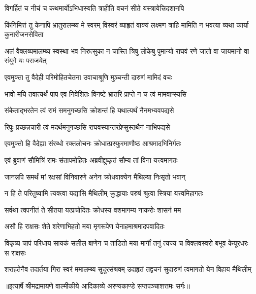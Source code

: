 \twolineshloka
{विगर्हितं च नीचं च कथमार्योऽभिधास्यति}
{त्राहीति वचनं सीते यस्त्रायेत्त्रिदशानपि} %

\threelineshloka
{किंनिमित्तं तु केनापि भ्रातुरालम्ब्य मे स्वरम्}
{विस्वरं व्याहृतं वाक्यं लक्ष्मण त्राहि मामिति}
{न भवत्या व्यथा कार्या कुनारीजनसेविता} %

\threelineshloka
{अलं वैक्लव्यमालम्ब्य स्वस्था भव निरुत्सुका}
{न चास्ति त्रिषु लोकेषु पुमान्यो राघवं रणे}
{जातो वा जायमानो वा संयुगे यः पराजयेत्} %

\twolineshloka
{एवमुक्ता तु वैदेही परिमोहितचेतना}
{उवाचाश्रूणि मुञ्चन्ती दारुणं मामिदं वचः} %

\twolineshloka
{भावो मयि तवात्यर्थं पाप एव निवेशितः}
{विनष्टे भ्रातरि प्राप्ते न च त्वं मामवाप्स्यसि} %

\twolineshloka
{संकेताद्भरतेन त्वं रामं समनुगच्छसि}
{क्रोशन्तं हि यथात्यर्थं नैनमभ्यवपद्यसे} %

\twolineshloka
{रिपुः प्रच्छन्नचारी त्वं मदर्थमनुगच्छसि}
{राघवस्यान्तरप्रेप्सुस्तथैनं नाभिपद्यसे} %

\twolineshloka
{एवमुक्तो हि वैदेह्या संरब्धो रक्तलोचनः}
{क्रोधात्प्रस्फुरमाणौष्ठ आश्रमादभिनिर्गतः} %

\twolineshloka
{एवं ब्रुवाणं सौमित्रिं रामः संतापमोहितः}
{अब्रवीद्दुष्कृतं सौम्य तां विना यत्त्वमागतः} %

\twolineshloka
{जानन्नपि समर्थं मां रक्षसां विनिवारणे}
{अनेन क्रोधवाक्येन मैथिल्या निःसृतो भवान्} %

\twolineshloka
{न हि ते परितुष्यामि त्यक्त्वा यद्यासि मैथिलीम्}
{क्रुद्धायाः परुषं श्रुत्वा स्त्रिया यत्त्वमिहागतः} %

\twolineshloka
{सर्वथा त्वपनीतं ते सीतया यत्प्रचोदितः}
{क्रोधस्य वशमागम्य नाकरोः शासनं मम} %

\twolineshloka
{असौ हि राक्षसः शेते शरेणाभिहतो मया}
{मृगरूपेण येनाहमाश्रमादपवादितः} %

\fourlineindentedshloka
{विकृष्य चापं परिधाय सायकं}
{ सलील बाणेन च ताडितो मया}
{मार्गीं तनुं त्यज्य च विक्लवस्वरो}
{ बभूव केयूरधरः स राक्षसः} %

\fourlineindentedshloka
{शराहतेनैव तदार्तया गिरा}
{ स्वरं ममालम्ब्य सुदूरसंश्रवम्}
{उदाहृतं तद्वचनं सुदारुणं}
{ त्वमागतो येन विहाय मैथिलीम्} %


{॥इत्यार्षे श्रीमद्रामायणे वाल्मीकीये आदिकाव्ये अरण्यकाण्डे सप्तपञ्चाशत्तमः सर्गः॥}


